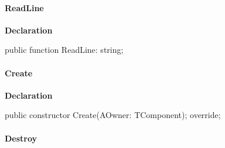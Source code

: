 \documentclass{report}
\newif\ifpdf
\begin{document}
\paragraph*{ReadLine}\hspace*{\fill}

\label{PasDoc_ProcessLineTalk.TProcessLineTalk-ReadLine}
\begin{list}{}{
\setlength{\itemindent}{0cm}
\setlength{\listparindent}{0cm}
\setlength{\leftmargin}{\evensidemargin}
\addtolength{\leftmargin}{\tmplength}
\settowidth{\labelsep}{X}
\addtolength{\leftmargin}{\labelsep}
\setlength{\labelwidth}{\tmplength}
}
\item[\textbf{Declaration}\hfill]
\ifpdf
\begin{flushleft}
\fi
\begin{ttfamily}
public function ReadLine: string;\end{ttfamily}

\ifpdf
\end{flushleft}
\fi

\end{list}
\paragraph*{Create}\hspace*{\fill}

\label{PasDoc_ProcessLineTalk.TProcessLineTalk-Create}
\begin{list}{}{
\setlength{\itemindent}{0cm}
\setlength{\listparindent}{0cm}
\setlength{\leftmargin}{\evensidemargin}
\addtolength{\leftmargin}{\tmplength}
\settowidth{\labelsep}{X}
\addtolength{\leftmargin}{\labelsep}
\setlength{\labelwidth}{\tmplength}
}
\item[\textbf{Declaration}\hfill]
\ifpdf
\begin{flushleft}
\fi
\begin{ttfamily}
public constructor Create(AOwner: TComponent); override;\end{ttfamily}

\ifpdf
\end{flushleft}
\fi

\end{list}
\paragraph*{Destroy}\hspace*{\fill}
\end{document}
